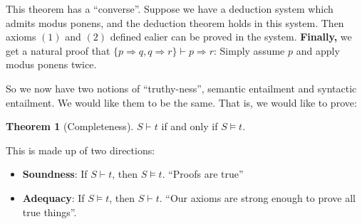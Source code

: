 \documentclass{article}
\theoremstyle{definition}
\newtheorem{theorem}{Theorem}
\numberwithin{definition}{section}
\newcommand{\entails}{\models}
\newcommand{\proves}{\vdash}
\begin{document}
  This theorem has a ``converse''.  Suppose we have a deduction system which 
admits modus ponens, and the deduction theorem holds in this system. Then 
axioms $(1)$ and $(2)$ defined ealier can be proved in the system. 
\textbf{Finally,} we get a natural proof that 
$\{p \Rightarrow q,q \Rightarrow r\} \proves p \Rightarrow r$: 
Simply assume $p$ and apply modus ponens twice. 

So we now have two notions of ``truthy-ness'', semantic entailment and 
syntactic entailment. We would like them to be the same. That is, we would 
like to prove:

\begin{theorem}[Completeness]
$S \proves t$ if and only if $S \entails t$. 
\end{theorem}

This is made up of two directions:
\begin{itemize}
  \item \textbf{Soundness}: If $S \proves t$, then $S \entails t$. 
    ``Proofs are true''
  \item \textbf{Adequacy}: If $S \entails t$, then $S \proves t$. 
    ``Our axioms are strong enough to prove all true things''.
\end{itemize}
\end{document}
